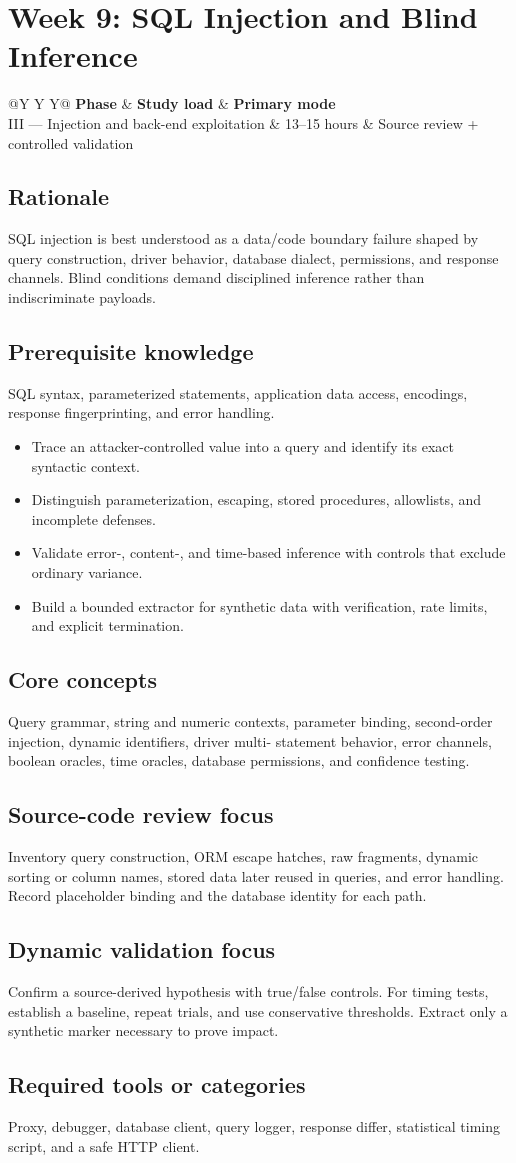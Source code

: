 \documentclass[11pt]{article}
\makeatletter
\newcommand{\weekheader}[4]{%
  \clearpage
  \section{Week #1: #2}
  \begin{tcolorbox}[colback=Navy,colframe=Navy,coltext=white]
    \begin{tabularx}{\linewidth}{@{}Y Y Y@{}}
      \textbf{Phase} & \textbf{Study load} & \textbf{Primary mode}\\
      #3 & #4 hours & Source review + controlled validation
    \end{tabularx}
  \end{tcolorbox}
}
\newcommand{\weekfield}[2]{%
  \Needspace{5\baselineskip}
  \subsection*{#1}
  #2
}
\makeatother
\begin{document}
\weekheader{9}{SQL Injection and Blind Inference}{III --- Injection and back-end exploitation}{13--15}

\weekfield{Rationale}{SQL injection is best understood as a data/code boundary
failure shaped by query construction, driver behavior, database dialect,
permissions, and response channels. Blind conditions demand disciplined inference
rather than indiscriminate payloads.}

\weekfield{Prerequisite knowledge}{SQL syntax, parameterized statements,
application data access, encodings, response fingerprinting, and error handling.}

\begin{objectivebox}
\begin{itemize}
  \item Trace an attacker-controlled value into a query and identify its exact syntactic context.
  \item Distinguish parameterization, escaping, stored procedures, allowlists, and incomplete defenses.
  \item Validate error-, content-, and time-based inference with controls that exclude ordinary variance.
  \item Build a bounded extractor for synthetic data with verification, rate limits, and explicit termination.
\end{itemize}
\end{objectivebox}

\weekfield{Core concepts}{Query grammar, string and numeric contexts,
parameter binding, second-order injection, dynamic identifiers, driver multi-
statement behavior, error channels, boolean oracles, time oracles, database
permissions, and confidence testing.}

\weekfield{Source-code review focus}{Inventory query construction, ORM escape
hatches, raw fragments, dynamic sorting or column names, stored data later reused
in queries, and error handling. Record placeholder binding and the database
identity for each path.}

\weekfield{Dynamic validation focus}{Confirm a source-derived hypothesis with
true/false controls. For timing tests, establish a baseline, repeat trials, and
use conservative thresholds. Extract only a synthetic marker necessary to prove
impact.}

\weekfield{Required tools or categories}{Proxy, debugger, database client,
query logger, response differ, statistical timing script, and a safe HTTP client.}
\end{document}
